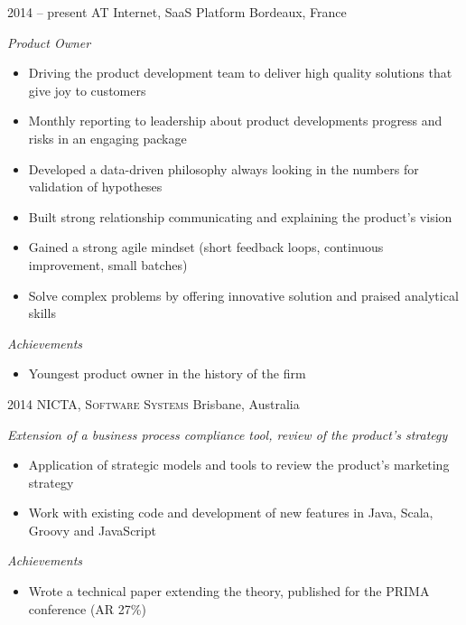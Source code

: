 \documentclass[]{friggeri-cv} %
\begin{document}
\begin{entrylist}
\entry
{2014 -- present}
{AT Internet, SaaS Platform}
{Bordeaux, France}
{\emph{Product Owner}
\begin{itemize}
\item Driving the product development team to deliver high quality solutions that give joy to customers
\item Monthly reporting to leadership about product developments progress and risks in an engaging package
\item Developed a data-driven philosophy always looking in the numbers for validation of hypotheses
\item Built strong relationship communicating and explaining the product's vision 
\item Gained a strong agile mindset (short feedback loops, continuous improvement, small batches)
\item Solve complex problems by offering innovative solution and praised analytical skills
\end{itemize}
\emph{Achievements}
\begin{itemize}
\item Youngest product owner in the history of the firm
\end{itemize}

}

\entry
{2014}
{NICTA, \textsc{Software Systems}}
{Brisbane, Australia}
{\emph{Extension of a business process compliance tool, review of the product's strategy}
\begin{itemize}
\item Application of strategic models and tools to review the product's marketing strategy
\item Work with existing code and development of new features in Java, Scala, Groovy and JavaScript
\end{itemize}
\emph{Achievements}
\begin{itemize}
\item Wrote a technical paper extending the theory, published for the PRIMA conference (AR 27\%)  
\end{itemize}
}


\end{entrylist}
\end{document}
